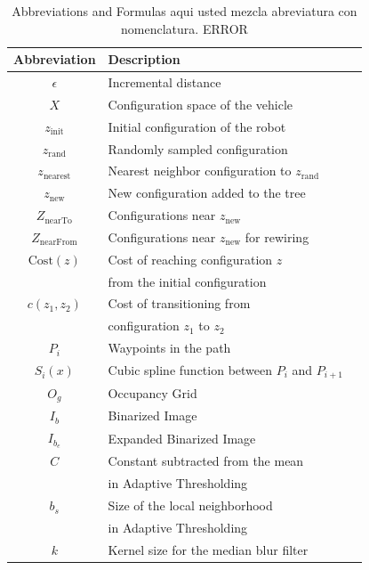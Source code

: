 \documentclass[conference]{IEEEtran}
\newcommand{\revR}[1]{\textcolor{myYellow}{#1}}
\begin{document}
\begin{table}[t!]
    \centering
    \caption{Abbreviations and Formulas \revR{aqui usted mezcla abreviatura con nomenclatura. ERROR}}
    \label{Table::abbreviations_continued}
    \begin{tabularx}{\columnwidth}{@{}clX@{}}
        \toprule
        \textbf{Abbreviation} & \textbf{Description} \\
        \midrule
        \textbf{$\epsilon$} & Incremental distance \\
        \textbf{$X$} & Configuration space of the vehicle \\
        \textbf{$z_{\text{init}}$} & Initial configuration of the robot \\
        \textbf{$z_{\text{rand}}$} & Randomly sampled configuration \\
        \textbf{$z_{\text{nearest}}$} & Nearest neighbor configuration to $z_{\text{rand}}$ \\
        \textbf{$z_{\text{new}}$} & New configuration added to the tree \\
        \textbf{$Z_{\text{nearTo}}$} & Configurations near $z_{\text{new}}$ \\
        \textbf{$Z_{\text{nearFrom}}$} & Configurations near $z_{\text{new}}$ for rewiring \\
        \textbf{$\text{Cost}(z)$} & Cost of reaching configuration $z$ \\
        & from the initial configuration  \\
        \textbf{$c(z_1, z_2)$} & Cost of transitioning from \\
        & configuration $z_1$ to $z_2$  \\
        \textbf{$P_i$} & Waypoints in the path \\
        \textbf{$S_i(x)$} & Cubic spline function between $P_i$ and $P_{i+1}$ \\
        \textbf{$O_{g}$} & Occupancy Grid \\
        \textbf{$I_{b}$} & Binarized Image \\
        \textbf{$I_{b_{e}}$} & Expanded Binarized Image \\
        \textbf{$C$} & Constant subtracted from the mean  \\
        & in Adaptive Thresholding \\
        \textbf{$b_{s}$} & Size of the local neighborhood \\
        & in Adaptive Thresholding  \\
        \textbf{$k$} & Kernel size for the median blur filter \\

\end{tabularx}
\end{table}
\end{document}
